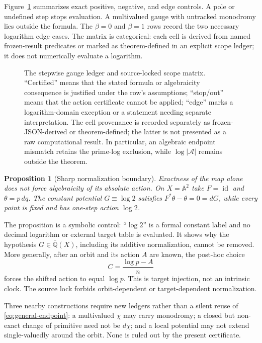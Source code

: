 \documentclass[11pt]{article}
\newtheorem{proposition}[theorem]{Proposition}
\theoremstyle{definition}
\theoremstyle{remark}
\newcommand{\A}{\mathbb A}
\newcommand{\Qbar}{\overline{\mathbb Q}}
\newcommand{\Action}{\mathcal A}
\begin{document}
Figure~\ref{fig:gauge-scope} summarizes exact positive, negative, and edge
controls.  A pole or undefined step stops evaluation.  A multivalued gauge
with untracked monodromy lies outside the formula.  The $\beta=0$ and
$\beta=1$ rows record the two necessary logarithm edge cases.  The matrix is
  categorical: each cell is derived from named frozen-result predicates or
  marked as theorem-defined in an explicit scope ledger; it does not
  numerically evaluate a logarithm.

\begin{figure}[t]
  \centering
  \GaugeScopeFigure
  \caption{The stepwise gauge ledger and source-locked scope matrix.
  ``Certified'' means that the stated formula or algebraicity consequence is
  justified under the row's assumptions; ``stop/out'' means that the action
  certificate cannot be applied; ``edge'' marks a logarithm-domain exception
  or a statement needing separate interpretation.  The cell provenance is
  recorded separately as frozen-JSON-derived or theorem-defined; the latter is
  not presented as a raw computational result.  In particular, an
  algebraic endpoint mismatch retains the prime-log exclusion, while
  $\log|\Action|$ remains outside the theorem.}
  \label{fig:gauge-scope}
\end{figure}

\begin{proposition}[Sharp normalization boundary]
\label{prop:identity-control}
Exactness of the map alone does not force algebraicity of its absolute
action.  On $X=\A^2$ take $F=\operatorname{id}$ and $\theta=p\,dq$.  The
constant potential $G\equiv\log 2$ satisfies
$F^*\theta-\theta=0=dG$, while every point is fixed and has one-step action
$\log 2$.
\end{proposition}

The proposition is a symbolic control: ``$\log 2$'' is a formal constant
label and no decimal logarithm or external target table is evaluated.  It
shows why the hypothesis $G\in\Qbar(X)$, including its additive
normalization, cannot be removed.  More generally, after an orbit and its
action $A$ are known, the post-hoc choice
\begin{equation}
  C=\frac{\log p-A}{n}
  \label{eq:target-injection}
\end{equation}
forces the shifted action to equal $\log p$.  This is target injection, not
an intrinsic clock.  The source lock forbids orbit-dependent or
target-dependent normalization.

Three nearby constructions require new ledgers rather than a silent reuse of
\eqref{eq:general-endpoint}: a multivalued $\chi$ may carry monodromy; a
closed but non-exact change of primitive need not be $d\chi$; and a local
potential may not extend single-valuedly around the orbit.  None is ruled out
by the present certificate.
\end{document}
